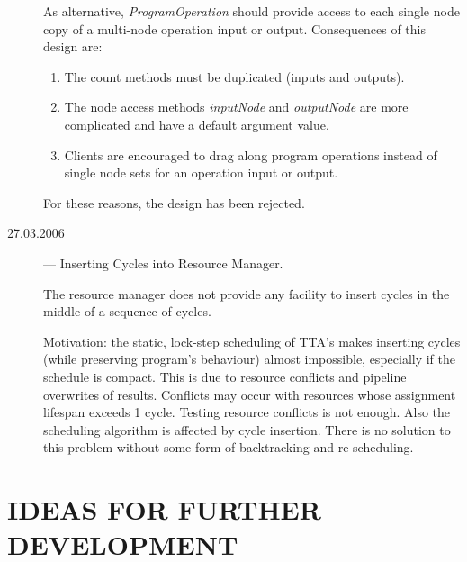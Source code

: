 \documentclass[a4paper,twoside]{tce}
\begin{document}
\begin{description}
  As alternative, \emph{ProgramOperation} should provide access to each
  single node copy of a multi-node operation input or output. Consequences
  of this design are:
  \begin{enumerate}
  \item %
    The count methods must be duplicated (inputs and outputs).
  \item %
    The node access methods \emph{inputNode} and \emph{outputNode} are more
    complicated and have a default argument value.
  \item %
    Clients are encouraged to drag along program operations instead of
    single node sets for an operation input or output.
  \end{enumerate}
  For these reasons, the design has been rejected.

\item[27.03.2006]

  --- Inserting Cycles into Resource Manager.

  The resource manager does not provide any facility to insert cycles in the
  middle of a sequence of cycles.

  Motivation: the static, lock-step scheduling of TTA's makes inserting
  cycles (while preserving program's behaviour) almost impossible,
  especially if the schedule is compact.
%
  This is due to resource conflicts and pipeline overwrites of results.
%
  Conflicts may occur with resources whose assignment lifespan exceeds 1
  cycle.
%
  Testing resource conflicts is not enough. Also the scheduling algorithm is
  affected by cycle insertion.
%
  There is no solution to this problem without some form of backtracking and
  re-scheduling.

\end{description}



\chapter{IDEAS FOR FURTHER DEVELOPMENT}

\end{document}
